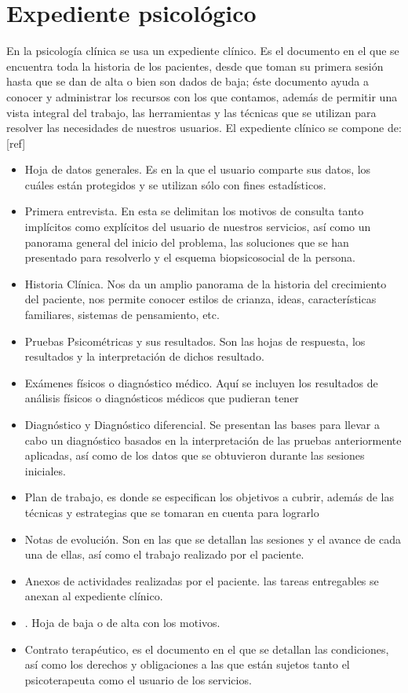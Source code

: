 \section{Expediente psicológico}

En la psicología clínica se usa un expediente clínico. Es el documento en el que se encuentra toda la historia de los pacientes, desde
que toman su primera sesión hasta que se dan de alta o bien son dados de baja; éste documento ayuda a
conocer y administrar los recursos con los que contamos, además de permitir una vista integral del trabajo, las
herramientas y las técnicas que se utilizan para resolver las necesidades de nuestros usuarios.
\newline
\newline
El expediente clínico se compone de: [ref]

\begin{itemize}
\item Hoja de datos generales. Es en la que el usuario comparte sus datos, los cuáles están protegidos y se
utilizan sólo con fines estadísticos.
\item Primera entrevista. En esta se delimitan los motivos de consulta tanto implícitos como explícitos del
usuario de nuestros servicios, así como un panorama general del inicio del problema, las soluciones
que se han presentado para resolverlo y el esquema biopsicosocial de la persona.
\item Historia Clínica. Nos da un amplio panorama de la historia del crecimiento del paciente, nos permite
conocer estilos de crianza, ideas, características familiares, sistemas de pensamiento, etc.
\item Pruebas Psicométricas y sus resultados. Son las hojas de respuesta, los resultados y la interpretación
de dichos resultado.
\item Exámenes físicos o diagnóstico médico. Aquí se incluyen los resultados de análisis físicos o
diagnósticos médicos que pudieran tener
\item Diagnóstico y Diagnóstico diferencial. Se presentan las bases para llevar a cabo un diagnóstico
basados en la interpretación de las pruebas anteriormente aplicadas, así como de los datos que se
obtuvieron durante las sesiones iniciales.
\item Plan de trabajo, es donde se especifican los objetivos a cubrir, además de las técnicas y estrategias que
se tomaran en cuenta para lograrlo
\item Notas de evolución. Son en las que se detallan las sesiones y el avance de cada una de ellas, así como
el trabajo realizado por el paciente.
\item Anexos de actividades realizadas por el paciente. las tareas entregables se anexan al expediente
clínico.
\item. Hoja de baja o de alta con los motivos.
\item Contrato terapéutico, es el documento en el que se detallan las condiciones, así como los derechos y
obligaciones a las que están sujetos tanto el psicoterapeuta como el usuario de los servicios.
\end{itemize}